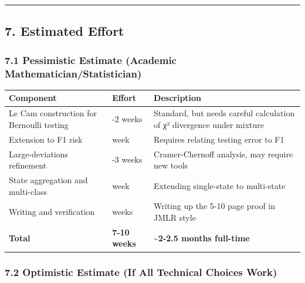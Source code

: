 \documentclass[
  12pt,
]{ctexart}
\begin{document}
\begin{center}\rule{0.5\linewidth}{0.5pt}\end{center}

\subsection{7. Estimated Effort}\label{estimated-effort}

\subsubsection{7.1 Pessimistic Estimate (Academic
Mathematician/Statistician)}\label{pessimistic-estimate-academic-mathematicianstatistician}

\begin{longtable}[]{@{}
  >{\raggedright\arraybackslash}p{}
  >{\raggedright\arraybackslash}p{}
  >{\raggedright\arraybackslash}p{}@{}}
\toprule\noalign{}
\begin{minipage}[b]{\linewidth}\raggedright
Component
\end{minipage} & \begin{minipage}[b]{\linewidth}\raggedright
Effort
\end{minipage} & \begin{minipage}[b]{\linewidth}\raggedright
Description
\end{minipage} \\
\midrule\noalign{}
\endhead
\bottomrule\noalign{}
\endlastfoot
Le Cam construction for Bernoulli testing & 1-2 weeks & Standard, but
needs careful calculation of χ² divergence under mixture \\
Extension to F1 risk & 1 week & Requires relating testing error to F1 \\
Large-deviations refinement & 2-3 weeks & Cramer-Chernoff analysis, may
require new tools \\
State aggregation and multi-class & 1 week & Extending single-state to
multi-state \\
Writing and verification & 2 weeks & Writing up the 5-10 page proof in
JMLR style \\
\textbf{Total} & \textbf{7-10 weeks} & \textbf{\textasciitilde2-2.5
months full-time} \\
\end{longtable}

\subsubsection{7.2 Optimistic Estimate (If All Technical Choices
Work)}\label{optimistic-estimate-if-all-technical-choices-work}
\end{document}
